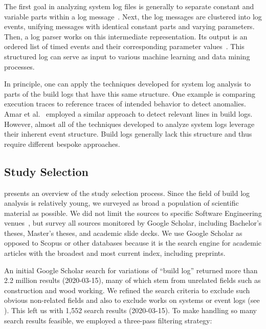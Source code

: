 The first goal in analyzing system log files is generally to
separate constant and variable parts within a log
message~\cite{nagappan2010abstracting,he2017towards}.
Next, the log
messages are clustered into log events, unifying messages with
identical constant parts and varying parameters.
Then, a log parser works on this intermediate representation.
Its output is an ordered list of timed events and their corresponding
parameter values~\cite{he2016evaluation}.
This structured log can serve as input to various machine learning and
data mining processes.

In principle, one can apply the techniques developed for system log
analysis
to parts of the build logs that have this same structure.
One example is comparing execution traces to reference
traces of intended behavior to detect anomalies.
Amar et
al.~\cite{amar2019mining} employed a similar approach to detect
relevant lines in build logs.
However, almost all of the techniques developed to analyze system logs
leverage their inherent event structure.
Build logs generally lack this structure and thus require different
bespoke approaches.


\subsection{Study Selection}
 presents an overview of the study selection
process.
Since the field of build log analysis is relatively young, we
surveyed as broad a population of scientific material as possible.
We did not limit the sources to specific Software Engineering
venues~\cite{petersen2015guidelines}, but survey all sources
monitored by Google Scholar, including Bachelor's theses, Master's
theses, and academic slide decks.
We use Google Scholar as opposed to Scopus or
other databases because it is the search engine for academic articles with
the broadest and most current index, including preprints.

An initial Google Scholar search for variations of ``build log''
returned more than 2.2 million results (2020-03-15), many of which stem
from unrelated fields such as construction and wood working.
We refined the search criteria to exclude such obvious
non-related fields and also to exclude works on systems
or event logs (see ).
This left us with 1,552 search results
(2020-03-15).
To make handling so many search results feasible, we employed a
three-pass filtering strategy:

